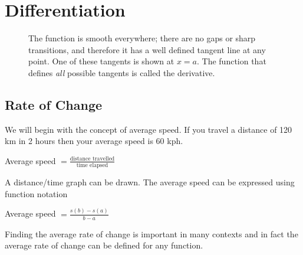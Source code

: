 \chapter[Differentiation]{Differentiation}
\begin{figure}[h]\begin{center}
		\caption{The function is smooth everywhere; there are no gaps or sharp transitions, and therefore it has a well defined tangent line at any point. One of these tangents is shown at $x=a$. The function that defines \textit{all} possible tangents is called the derivative.}\end{center}
\end{figure}

\section*{Rate of Change}
We will begin with the concept of average speed. If you travel a distance of 120 km in 2 hours then your average speed is 60 kph. 
\begin{center}
Average speed $ =\displaystyle\frac{\text{distance travelled}}{\text{time elapsed}}$
\end{center}\par
A distance/time graph can be drawn. The average speed can be expressed using function notation 
\begin{center}
Average speed $\displaystyle =\frac{s (b) -s (a)}{b -a}$
\end{center}\par
Finding the average rate of change is important in many contexts and in fact the average rate of change can be defined for any function. 

